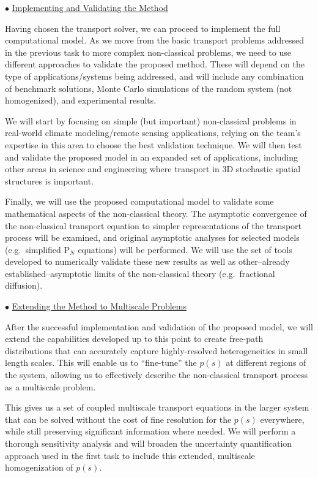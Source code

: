 \documentclass[12pt]{article}
\begin{document}
$\bullet$ \underline{Implementing and Validating the Method}

Having chosen the transport solver, we can proceed to implement the full computational model.
As we move from the basic transport problems addressed in the previous task to more complex non-classical problems, we need to use different approaches to validate the proposed method.
These will depend on the type of applications/systems being addressed, and will include any combination of benchmark solutions, Monte Carlo simulations of the random system (not homogenized), and experimental results.

We will start by focusing on simple (but important) non-classical problems in real-world climate modeling/remote sensing applications, relying on the team's expertise in this area to choose the best validation technique.
We will then test and validate the proposed model in an expanded set of applications, including other areas in science and engineering where transport in 3D stochastic spatial structures is important.

Finally, we will use the proposed computational model to validate some mathematical aspects of the non-classical theory.
The asymptotic convergence of the non-classical transport equation to simpler representations of the transport process will be examined, and original asymptotic analyses for selected models (e.g.\ simplified P$_N$ equations) will be performed.
We will use the set of tools developed to numerically validate these new results as well as other--already established--asymptotic limits of the non-classical theory (e.g.\ fractional diffusion).

$\bullet$ \underline{Extending the Method to Multiscale Problems}

After the successful implementation and validation of the proposed model, we will extend the capabilities developed up to this point to create free-path distributions that can accurately capture highly-resolved heterogeneities in small length scales.
This will enable us to ``fine-tune'' the $p(s)$ at different regions of the system, allowing us to effectively describe the non-classical transport process as a multiscale problem.

This gives us a set of coupled multiscale transport equations in the larger system that can be solved without the cost of fine resolution for the $p(s)$ everywhere, while still preserving significant information where needed.
We will perform a thorough sensitivity analysis and will broaden the uncertainty quantification approach used in the first task to include this extended, multiscale homogenization of $p(s)$.
\end{document}
